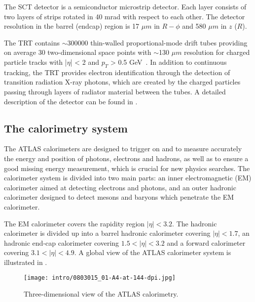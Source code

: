 The SCT detector is a semiconductor microstrip detector. Each layer consists of two layers of strips rotated in 40 mrad with respect to each other.
The detector resolution in the barrel (endcap) region is 17 $\mu m$ in $R-\phi$ and 580 $\mu m$ in $z$ ($R$).

The TRT contains $\sim$300000 thin-walled proportional-mode drift tubes providing on average 30 two-dimensional 
space points with $\sim$130 $\mu m$ resolution for charged particle tracks with |$\eta$| < 2 and $p_T$ > 0.5 GeV~\cite{Abat:2008zza,Abat:2008zzb,Abat:2008zz}.
In addition to continuous tracking, the TRT provides electron identification through the detection of transition radiation X-ray photons, which are created by the charged particles passing through layers of radiator material between the tubes.
A detailed description of the detector can be found in .

\subsection{The calorimetry system}

The ATLAS calorimeters are designed to trigger on and to measure accurately the energy and position of photons, electrons and hadrons, as well as to ensure a good missing energy measurement, which is crucial for new physics searches. The calorimeter system is divided into two main parts: an inner electromagnetic (EM) calorimeter aimed at detecting electrons and photons, and an outer hadronic calorimeter designed to detect mesons and baryons which penetrate the EM calorimeter.

The EM calorimeter covers the rapidity region $|\eta| < 3.2$.
The hadronic calorimeter is divided up into a barrel hadronic calorimeter covering $|\eta| < 1.7$, an hadronic end-cap calorimeter covering $1.5 < |\eta| < 3.2$ and a forward calorimeter covering $3.1 < |\eta| < 4.9$. A global view of the ATLAS calorimeter system is illustrated in .

\begin{figure}[h!]
\centering
 \texttt{[image: intro/0803015\_01-A4-at-144-dpi.jpg]}
 \caption{Three-dimensional view of the ATLAS calorimetry.}
\label{fig:Calo}
\end{figure}

